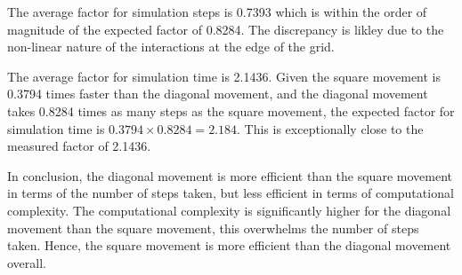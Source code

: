 The average factor for simulation steps is 0.7393 which is within the order of magnitude of the expected factor of 0.8284.
The discrepancy is likley due to the non-linear nature of the interactions at the edge of the grid.

The average factor for simulation time is 2.1436.
Given the square movement is 0.3794 times faster than the diagonal movement,
and the diagonal movement takes 0.8284 times as many steps as the square movement,
the expected factor for simulation time is $0.3794 \times 0.8284 = 2.184$.
This is exceptionally close to the measured factor of 2.1436.


In conclusion, the diagonal movement is more efficient than the square movement in terms of the number of steps taken, but less efficient in terms of computational complexity.
The computational complexity is significantly higher for the diagonal movement than the square movement, this overwhelms the number of steps taken.
Hence, the square movement is more efficient than the diagonal movement overall.

\clearpage